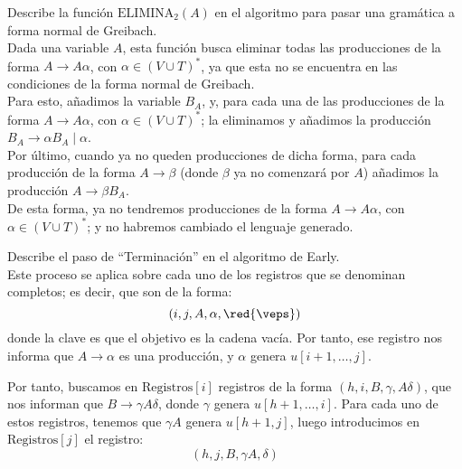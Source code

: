 \documentclass[12pt]{article}
\begin{document}
    \begin{ejercicio}[1.25 puntos]
        Describe la función $\text{ELIMINA}_2(A)$ en el algoritmo para pasar una gramática a forma normal de Greibach.\\

        Dada una variable $A$, esta función busca eliminar todas las producciones de la forma $A\to A\alpha$, con $\alpha\in (V\cup T)^*$, ya que esta no se encuentra en las condiciones de la forma normal de Greibach.\\

        Para esto, añadimos la variable $B_A$, y, para cada una de las producciones de la forma $A\to A\alpha$, con $\alpha\in (V\cup T)^*$; la eliminamos y añadimos la producción $B_A\rightarrow \alpha B_A\mid \alpha$.\\
        
        Por último, cuando ya no queden producciones de dicha forma, para cada producción de la forma $A\rightarrow \beta$ (donde $\beta$ ya no comenzará por $A$) añadimos la producción $A\rightarrow \beta B_A$.\\

        De esta forma, ya no tendremos producciones de la forma $A\to A\alpha$, con $\alpha\in (V\cup T)^*$; y no habremos cambiado el lenguaje generado.
    \end{ejercicio}

    \begin{ejercicio}[1.25 puntos]
        Describe el paso de ``Terminación'' en el algoritmo de Early.\\

        Este proceso se aplica sobre cada uno de los registros que se denominan completos; es decir, que son de la forma:
        \begin{equation*}
            (i,j,A,\alpha,\red{\veps})
        \end{equation*}
        donde la clave es que el objetivo es la cadena vacía. Por tanto, ese registro nos informa que $A\rightarrow \alpha$ es una producción, y $\alpha$ genera $u[i+1,\dots,j]$.

        Por tanto, buscamos en $\text{Registros}[i]$ registros de la forma $(h,i,B,\gamma,A\delta)$, que nos informan que $B\rightarrow \gamma A\delta$, donde $\gamma$ genera $u[h+1,\dots,i]$. Para cada uno de estos registros, tenemos que $\gamma A$ genera $u[h+1,j]$, luego introducimos en $\text{Registros}[j]$ el registro:
        \begin{equation*}
            (h,j,B,\gamma A,\delta)
        \end{equation*}
    \end{ejercicio}
\end{document}
